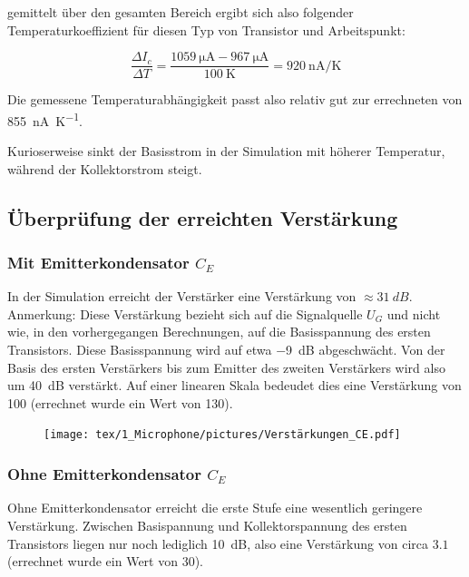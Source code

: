 gemittelt über den gesamten Bereich ergibt sich also folgender Temperaturkoeffizient für diesen Typ von Transistor und Arbeitspunkt:

\begin{equation*}
    \frac{\Delta I_{c}}{\Delta T} = \frac{\SI{1059}{\micro \ampere} - \SI{967}{\micro \ampere}}{\SI{100}{\kelvin}} = \SI{920}{\nano \ampere \per \kelvin}
\end{equation*}

Die \glqq gemessene \grqq{} Temperaturabhängigkeit passt also relativ gut zur errechneten von \SI{855}{\nano \ampere \per \kelvin}.

Kurioserweise sinkt der Basisstrom in der Simulation mit höherer Temperatur, während der Kollektorstrom steigt.

\subsection{Überprüfung der erreichten Verstärkung}

\subsubsection{Mit Emitterkondensator $C_E$}

In der Simulation erreicht der Verstärker eine Verstärkung von $\approx \SI{31}{dB}$. Anmerkung: Diese Verstärkung bezieht sich auf die Signalquelle $U_G$ und nicht wie, in den vorhergegangen Berechnungen, auf die Basisspannung des ersten Transistors. Diese Basisspannung wird auf etwa \SI{-9}{dB} abgeschwächt. Von der Basis des ersten Verstärkers bis zum Emitter des zweiten Verstärkers wird also um \SI{40}{dB} verstärkt.
Auf einer linearen Skala bedeudet dies eine Verstärkung von 100 (errechnet wurde ein Wert von 130).

\begin{figure}[H]
    \centering
    \texttt{[image: tex/1\_Microphone/pictures/Verstärkungen\_CE.pdf]}
    \label{fig:my_label}
\end{figure}

\subsubsection{Ohne Emitterkondensator $C_E$}

Ohne Emitterkondensator erreicht die erste Stufe eine wesentlich geringere Verstärkung. Zwischen Basispannung und Kollektorspannung des ersten Transistors liegen nur noch lediglich \SI{10}{dB}, also eine Verstärkung von circa $3.1$ (errechnet wurde ein Wert von 30). 

